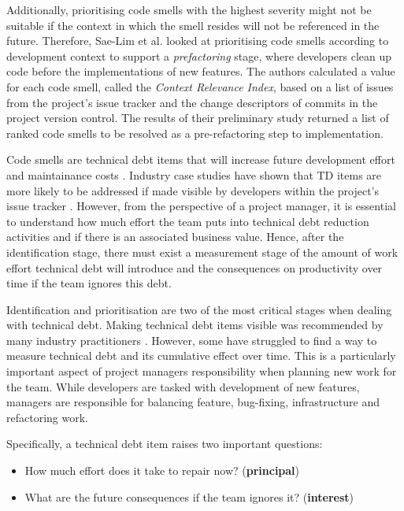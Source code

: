 \documentclass{mprop}
\begin{document}
Additionally, prioritising code smells with the highest severity might not be
suitable if the context in which the smell resides will not be referenced in the
future. Therefore, Sae-Lim et al. \cite{Sae-Lim2016} looked at prioritising code
smells according to development context to support a \textit{prefactoring}
stage, where developers clean up code before the implementations of new
features. The authors calculated a value for each code smell, called the
\textit{Context Relevance Index}, based on a list of issues from the project's
issue tracker and the change descriptors of commits in the project version
control. The results of their preliminary study returned a list of ranked code
smells to be resolved as a pre-refactoring step to implementation.

Code smells are technical debt items that will increase future development
effort and maintainance costs \cite{Fowler1999}. Industry case studies have
shown that TD items are more likely to be addressed if made visible by
developers within the project's issue tracker \cite{Lim2012}. However, from the
perspective of a project manager, it is essential to understand how much effort
the team puts into technical debt reduction activities and if there is an
associated business value. Hence, after the identification stage, there must
exist a measurement stage of the amount of work effort technical debt will
introduce and the consequences on productivity over time if the team ignores
this debt.


Identification and prioritisation are two of the most critical stages when
dealing with technical debt. Making technical debt items visible was recommended
by many industry practitioners \cite{Lim2012} \cite{Codabux2013}. However, some
have struggled to find a way to measure technical debt and its cumulative effect
over time. This is a particularly important aspect of project managers
responsibility when planning new work for the team. While developers are tasked
with development of new features, managers are responsible for balancing
feature, bug-fixing, infrastructure and refactoring work.

Specifically, a technical debt item raises two important questions:
\begin{itemize}
	\item How much effort does it take to repair now? (\textbf{principal})
	\item What are the future consequences if the team ignores it? (\textbf{interest})
\end{itemize}
\end{document}

